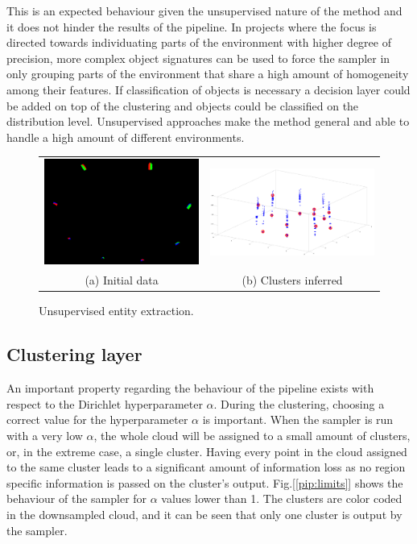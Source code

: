 \documentclass[twoside,hidelinks]{article}
\begin{document}
This is an expected behaviour given the unsupervised nature of the method and it does not hinder the results of the pipeline. In projects where the focus is directed towards individuating parts of the environment with higher degree of precision, more complex object signatures can be used to force the sampler in only grouping parts of the environment that share a high amount of homogeneity among their features. If classification of objects is necessary a decision layer could be added on top of the clustering and objects could be classified on the distribution level. Unsupervised approaches make the method general and able to handle a high amount of different environments. 


\begin{figure}[!ht]
\begin{tabular}{cc}
    \includegraphics[width=.5\textwidth]{8boxesData} &  \includegraphics[width=.5\textwidth]{8boxes} \\
  (a) Initial data  & (b) Clusters inferred \\[6pt]
\end{tabular}
\caption{Unsupervised entity extraction.}
  \label{pip:beh}
\end{figure}


\subsection{Clustering layer}

An important property regarding the behaviour of the pipeline exists with respect to the Dirichlet hyperparameter $\alpha$. During the clustering, choosing a correct value for the hyperparameter $\alpha$ is important. When the sampler is run with a very low $\alpha$, the whole cloud will be assigned to a small amount of clusters, or, in the extreme case, a single cluster. Having every point in the cloud assigned to the same cluster leads to a significant amount of information loss as no region specific information is passed on the cluster's output. Fig.[\ref{pip:limits}] shows the behaviour of the sampler for $\alpha$ values lower than 1. The clusters are color coded in the downsampled cloud, and it can be seen that only one cluster is output by the sampler.
\end{document}
